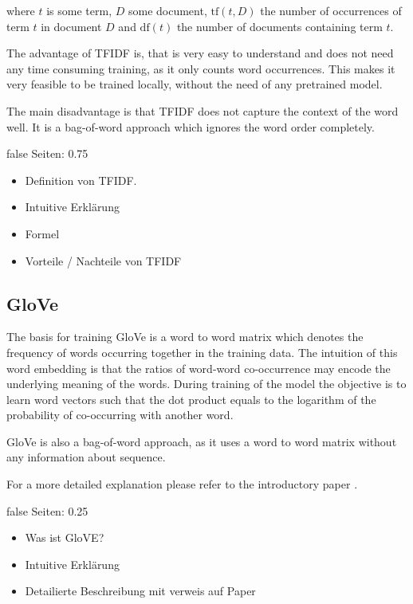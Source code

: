 \documentclass[draft,final,oneside]{vutinfth} %
\begin{document}
where $t$ is some term, $D$ some document, $\text{tf}(t, D)$ the number of occurrences of term $t$ in document $D$ and $\text{df}(t)$ the number of documents containing term $t$.

The advantage of TFIDF is, that is very easy to understand and does not need any time consuming training, as it only counts word occurrences. This makes it very feasible to be trained locally, without the need of any pretrained model.

The main disadvantage is that TFIDF does not capture the context of the word well. It is a bag-of-word approach which ignores the word order completely.

\if false
Seiten: 0.75

\begin{itemize}
\item Definition von TFIDF. 
\item Intuitive Erklärung
\item Formel
\item Vorteile / Nachteile von TFIDF
\end{itemize}

\fi

\subsection{GloVe \cite{glovepage}}
The basis for training GloVe is a word to word matrix which denotes the frequency of words occurring together in the training data. The intuition of this word embedding is that the ratios of word-word co-occurrence may encode the underlying meaning of the words. During training of the model the objective is to learn word vectors such that the dot product equals to the logarithm of the probability of co-occurring with another word.

GloVe is also a bag-of-word approach, as it uses a word to word matrix without any information about sequence.

For a more detailed explanation please refer to the introductory paper \cite{glovepage}.

\if false
Seiten: 0.25

\begin{itemize}
\item Was ist GloVE?
\item Intuitive Erklärung
\item Detailierte Beschreibung mit verweis auf Paper
\end{itemize}
\end{document}
